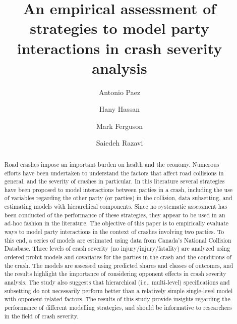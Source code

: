 \documentclass[]{elsarticle} %
\begin{document}
\begin{frontmatter}

  \title{An empirical assessment of strategies to model party interactions in
crash severity analysis}
    \author[McMaster University]{Antonio Paez}
    \author[Louisiana State University]{Hany Hassan}
    \author[McMaster University]{Mark Ferguson}
    \author[McMaster University]{Saiedeh Razavi}
      \address[McMaster University]{McMaster Institute for Transportation and Logistics, McMaster
University, 1280 Main Street West, Hamilton, Ontario, Canada L8S 4K1}
    \address[Louisiana State University]{Department of Civil and Environmental Engineering, Louisiana State
University, Baton Rouge, Louisiana, USA 70803}
    
  \begin{abstract}
  Road crashes impose an important burden on health and the economy.
  Numerous efforts have been undertaken to understand the factors that
  affect road collisions in general, and the severity of crashes in
  particular. In this literature several strategies have been proposed to
  model interactions between parties in a crash, including the use of
  variables regarding the other party (or parties) in the collision, data
  subsetting, and estimating models with hierarchical components. Since no
  systematic assessment has been conducted of the performance of these
  strategies, they appear to be used in an ad-hoc fashion in the
  literature. The objective of this paper is to empirically evaluate ways
  to model party interactions in the context of crashes involving two
  parties. To this end, a series of models are estimated using data from
  Canada's National Collision Database. Three levels of crash severity (no
  injury/injury/fatality) are analyzed using ordered probit models and
  covariates for the parties in the crash and the conditions of the crash.
  The models are assessed using predicted shares and classes of outcomes,
  and the results highlight the importance of considering opponent effects
  in crash severity analysis. The study also suggests that hierarchical
  (i.e., multi-level) specifications and subsetting do not necessarily
  perform better than a relatively simple single-level model with
  opponent-related factors. The results of this study provide insights
  regarding the performance of different modelling strategies, and should
  be informative to researchers in the field of crash severity.
  \end{abstract}
  
 \end{frontmatter}
\end{document}
